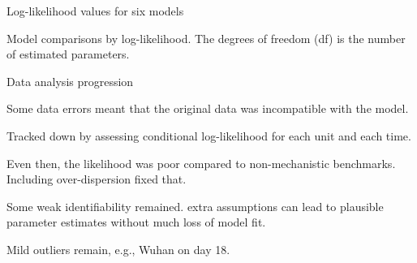 \documentclass{beamer}
\begin{document}
\begin{frame}{Log-likelihood values for six models}


  \vspace{10mm}
  
Model comparisons by log-likelihood. The degrees of freedom (df) is the number of estimated parameters. 
  

\end{frame}

\begin{frame}{Data analysis progression}
  \bi
\item Some data errors meant that the original data was incompatible with the model.
\item Tracked down by assessing conditional log-likelihood for each unit and each time.
\item Even then, the likelihood was poor compared to non-mechanistic benchmarks. Including over-dispersion fixed that.
\item Some weak identifiability remained. extra assumptions can lead to plausible parameter estimates without much loss of model fit.
\item Mild outliers remain, e.g., Wuhan on day 18.  
  \ei

\end{frame}
\end{document}
